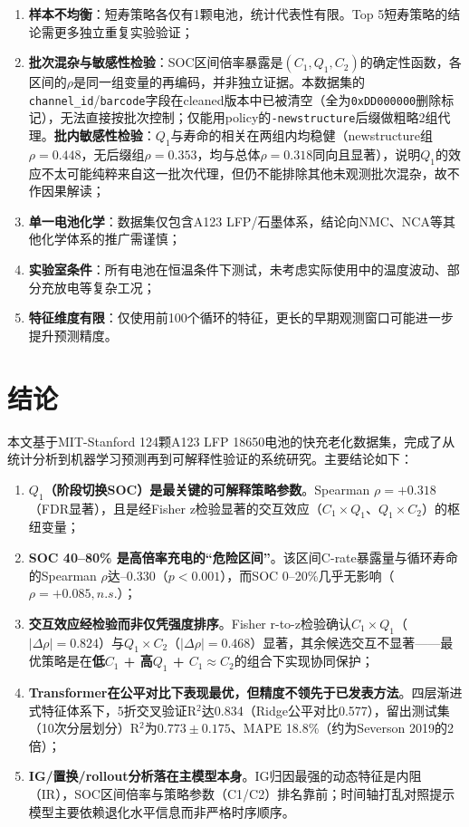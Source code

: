 \documentclass[12pt,a4paper]{ctexart}
\begin{document}
\begin{enumerate}[label=(\arabic*), leftmargin=*]
    \item \textbf{样本不均衡}：短寿策略各仅有1颗电池，统计代表性有限。Top 5短寿策略的结论需更多独立重复实验验证；
    \item \textbf{批次混杂与敏感性检验}：SOC区间倍率暴露是$(C_1,Q_1,C_2)$的确定性函数，各区间的$\rho$是同一组变量的再编码，并非独立证据。本数据集的\texttt{channel\_id}/\texttt{barcode}字段在cleaned版本中已被清空（全为\texttt{0xDD000000}删除标记），无法直接按批次控制；仅能用policy的\texttt{-newstructure}后缀做粗略2组代理。\textbf{批内敏感性检验}：$Q_1$与寿命的相关在两组内均稳健（newstructure组$\rho=0.448$，无后缀组$\rho=0.353$，均与总体$\rho=0.318$同向且显著），说明$Q_1$的效应不太可能纯粹来自这一批次代理，但仍不能排除其他未观测批次混杂，故不作因果解读；
    \item \textbf{单一电池化学}：数据集仅包含A123 LFP/石墨体系，结论向NMC、NCA等其他化学体系的推广需谨慎；
    \item \textbf{实验室条件}：所有电池在恒温条件下测试，未考虑实际使用中的温度波动、部分充放电等复杂工况；
    \item \textbf{特征维度有限}：仅使用前100个循环的特征，更长的早期观测窗口可能进一步提升预测精度。
\end{enumerate}

\section{结论}

本文基于MIT-Stanford 124颗A123 LFP 18650电池的快充老化数据集，完成了从统计分析到机器学习预测再到可解释性验证的系统研究。主要结论如下：

\begin{enumerate}[label=(\arabic*), leftmargin=*]
    \item \textbf{$Q_1$（阶段切换SOC）是最关键的可解释策略参数}。Spearman $\rho = +0.318$（FDR显著），且是经Fisher z检验显著的交互效应（$C_1\times Q_1$、$Q_1\times C_2$）的枢纽变量；
    \item \textbf{SOC 40--80\% 是高倍率充电的``危险区间''}。该区间C-rate暴露量与循环寿命的Spearman $\rho$达--0.330（$p<0.001$），而SOC 0--20\%几乎无影响（$\rho=+0.085, n.s.$）；
    \item \textbf{交互效应经检验而非仅凭强度排序}。Fisher r-to-z检验确认$C_1\times Q_1$（$|\Delta\rho|=0.824$）与$Q_1\times C_2$（$|\Delta\rho|=0.468$）显著，其余候选交互不显著——最优策略是在\textbf{低$C_1$ + 高$Q_1$ + $C_1 \approx C_2$}的组合下实现协同保护；
    \item \textbf{Transformer在公平对比下表现最优，但精度不领先于已发表方法}。四层渐进式特征体系下，5折交叉验证R$^2$达0.834（Ridge公平对比0.577），留出测试集（10次分层划分）R$^2$为$0.773\pm0.175$、MAPE 18.8\%（约为Severson 2019的2倍）；
    \item \textbf{IG/置换/rollout分析落在主模型本身}。IG归因最强的动态特征是内阻（IR），SOC区间倍率与策略参数（C1/C2）排名靠前；时间轴打乱对照提示模型主要依赖退化水平信息而非严格时序顺序。
\end{enumerate}
\end{document}
